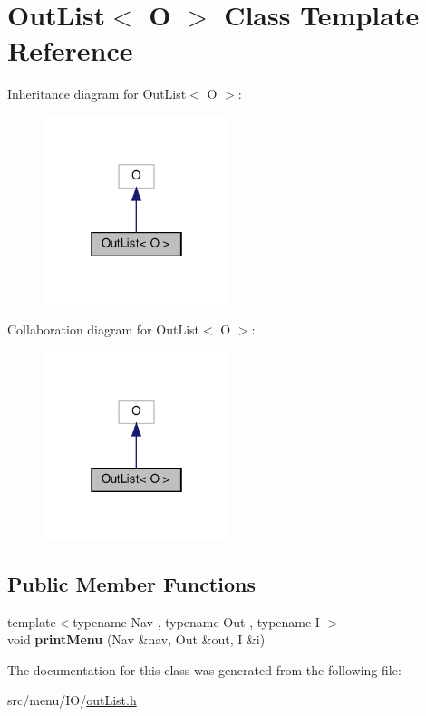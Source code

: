\hypertarget{classOutList_3_01O_01_4}{}\section{Out\+List$<$ O $>$ Class Template Reference}
\label{classOutList_3_01O_01_4}


Inheritance diagram for Out\+List$<$ O $>$\+:\nopagebreak
\begin{figure}[H]
\begin{center}
\leavevmode
\includegraphics[width=154pt]{classOutList_3_01O_01_4__inherit__graph}
\end{center}
\end{figure}


Collaboration diagram for Out\+List$<$ O $>$\+:\nopagebreak
\begin{figure}[H]
\begin{center}
\leavevmode
\includegraphics[width=154pt]{classOutList_3_01O_01_4__coll__graph}
\end{center}
\end{figure}
\subsection*{Public Member Functions}
\begin{DoxyCompactItemize}
\item 
\mbox{\label{classOutList_3_01O_01_4_a1807db22ab1b84545af1196b1713204f}} 
{\footnotesize template$<$typename Nav , typename Out , typename I $>$ }\\void {\bfseries print\+Menu} (Nav \&nav, Out \&out, I \&i)
\end{DoxyCompactItemize}


The documentation for this class was generated from the following file\+:\begin{DoxyCompactItemize}
\item 
src/menu/\+I\+O/\hyperlink{outList_8h}{out\+List.\+h}\end{DoxyCompactItemize}
